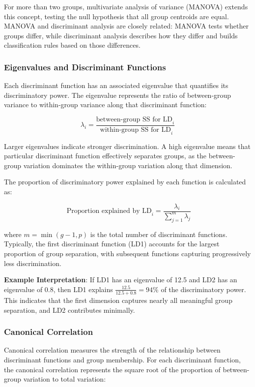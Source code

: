 \documentclass[
]{article}
\begin{document}
For more than two groups, multivariate analysis of variance (MANOVA)
extends this concept, testing the null hypothesis that all group
centroids are equal. MANOVA and discriminant analysis are closely
related: MANOVA tests whether groups differ, while discriminant analysis
describes how they differ and builds classification rules based on those
differences.

\subsubsection{Eigenvalues and Discriminant Functions}

Each discriminant function has an associated eigenvalue that quantifies
its discriminatory power. The eigenvalue represents the ratio of
between-group variance to within-group variance along that discriminant
function:

\[\lambda_{i} = \frac{\text{between-group SS for LD}_{i}}{\text{ within-group SS for LD}_{i}}\]

Larger eigenvalues indicate stronger discrimination. A high eigenvalue
means that particular discriminant function effectively separates
groups, as the between-group variation dominates the within-group
variation along that dimension.

The proportion of discriminatory power explained by each function is
calculated as:

\[\text{ Proportion explained by LD}_{i} = \frac{\lambda_{i}}{\sum_{j = 1}^{m}\lambda_{j}}\]

where \(m = \min(g - 1,p)\) is the total number of discriminant
functions. Typically, the first discriminant function (LD1) accounts for
the largest proportion of group separation, with subsequent functions
capturing progressively less discrimination.

\textbf{Example Interpretation}: If LD1 has an eigenvalue of 12.5 and
LD2 has an eigenvalue of 0.8, then LD1 explains
\(\frac{12.5}{12.5 + 0.8} = 94\%\) of the discriminatory power. This
indicates that the first dimension captures nearly all meaningful group
separation, and LD2 contributes minimally.

\subsubsection{Canonical Correlation}

Canonical correlation measures the strength of the relationship between
discriminant functions and group membership. For each discriminant
function, the canonical correlation represents the square root of the
proportion of between-group variation to total variation:
\end{document}
